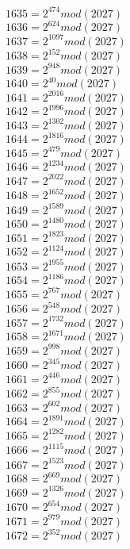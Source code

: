 \documentclass[12pt, letterpaper]{article}
\begin{document}
\begin{itemize}
\begin{multicols}{3}
$1635= 2^{474} mod (2027)$\\
$1636= 2^{624} mod (2027)$\\
$1637= 2^{1097} mod (2027)$\\
$1638= 2^{152} mod (2027)$\\
$1639= 2^{948} mod (2027)$\\
$1640= 2^{40} mod (2027)$\\
$1641= 2^{2016} mod (2027)$\\
$1642= 2^{1996} mod (2027)$\\
$1643= 2^{1302} mod (2027)$\\
$1644= 2^{1816} mod (2027)$\\
$1645= 2^{479} mod (2027)$\\
$1646= 2^{1234} mod (2027)$\\
$1647= 2^{2022} mod (2027)$\\
$1648= 2^{1652} mod (2027)$\\
$1649= 2^{1589} mod (2027)$\\
$1650= 2^{1480} mod (2027)$\\
$1651= 2^{1823} mod (2027)$\\
$1652= 2^{1124} mod (2027)$\\
$1653= 2^{1955} mod (2027)$\\
$1654= 2^{1186} mod (2027)$\\
$1655= 2^{767} mod (2027)$\\
$1656= 2^{548} mod (2027)$\\
$1657= 2^{1732} mod (2027)$\\
$1658= 2^{1671} mod (2027)$\\
$1659= 2^{998} mod (2027)$\\
$1660= 2^{345} mod (2027)$\\
$1661= 2^{446} mod (2027)$\\
$1662= 2^{855} mod (2027)$\\
$1663= 2^{602} mod (2027)$\\
$1664= 2^{1891} mod (2027)$\\
$1665= 2^{1282} mod (2027)$\\
$1666= 2^{1115} mod (2027)$\\
$1667= 2^{1523} mod (2027)$\\
$1668= 2^{669} mod (2027)$\\
$1669= 2^{1326} mod (2027)$\\
$1670= 2^{654} mod (2027)$\\
$1671= 2^{979} mod (2027)$\\
$1672= 2^{352} mod (2027)$\\

\end{multicols}
\end{itemize}
\end{document}
